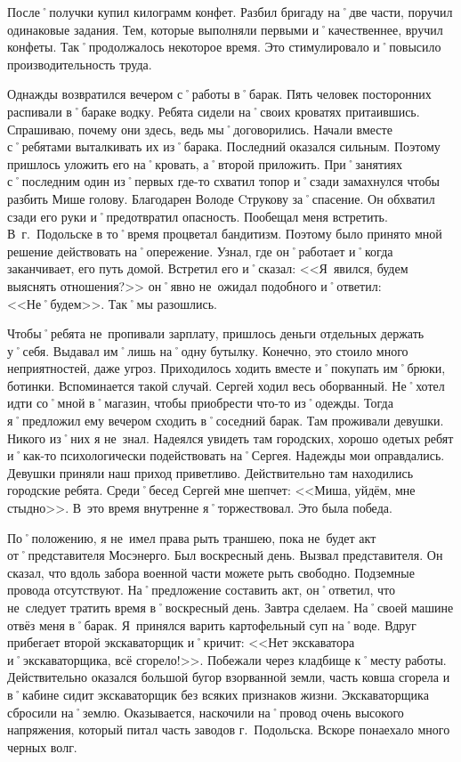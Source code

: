 После˚получки купил килограмм конфет. Разбил бригаду на˚две части, поручил одинаковые задания. Тем, которые выполняли первыми и˚качественнее, вручил конфеты. Так˚продолжалось некоторое время. Это стимулировало и˚повысило производительность труда.

Однажды возвратился вечером с˚работы в˚барак. Пять человек посторонних распивали в˚бараке водку. Ребята сидели на˚своих кроватях притаившись. Спрашиваю, почему они здесь, ведь мы˚договорились. Начали вместе с˚ребятами выталкивать их из˚барака. Последний оказался сильным. Поэтому пришлось уложить его на˚кровать, а˚второй приложить. При˚занятиях с˚последним один из˚первых где-то схватил топор и˚сзади замахнулся чтобы разбить Мише голову. Благодарен Володе Cтрукову за˚спасение. Он обхватил сзади его руки и˚предотвратил опасность. Пообещал меня встретить. В~г.~Подольске в то˚время процветал бандитизм. Поэтому было принято мной решение действовать на˚опережение. Узнал, где он˚работает и˚когда заканчивает, его путь домой. Встретил его и˚сказал: <<Я~явился, будем выяснять отношения?>> он˚явно не~ожидал подобного и˚ответил: <<Не˚будем>>. Так˚мы разошлись.

Чтобы˚ребята не~пропивали зарплату, пришлось деньги отдельных держать у˚себя. Выдавал им˚лишь на˚одну бутылку. Конечно, это стоило много неприятностей, даже угроз. Приходилось ходить вместе и˚покупать им˚брюки, ботинки. Вспоминается такой случай. Сергей ходил весь оборванный. Не˚хотел идти со˚мной в˚магазин, чтобы приобрести что-то из˚одежды. Тогда я˚предложил ему вечером сходить в˚соседний барак. Там проживали девушки. Никого из˚них я не~знал. Надеялся увидеть там городских, хорошо одетых ребят и˚как-то психологически подействовать на˚Сергея. Надежды мои оправдались. Девушки приняли наш приход приветливо. Действительно там находились городские ребята. Среди˚бесед Сергей мне шепчет: <<Миша, уйдём, мне стыдно>>. В~это время внутренне я˚торжествовал. Это была победа.

По˚положению, я не~имел права рыть траншею, пока не~будет акт от˚представителя Мосэнерго. Был воскресный день. Вызвал представителя. Он сказал, что вдоль забора военной части можете рыть свободно. Подземные провода отсутствуют. На˚предложение составить акт, он˚ответил, что не~следует тратить время в˚воскресный день. Завтра сделаем. На˚своей машине отвёз меня в˚барак. Я~принялся варить картофельный суп на˚воде. Вдруг прибегает второй экскаваторщик и˚кричит: <<Нет экскаватора и˚экскаваторщика, всё сгорело!>>. Побежали через кладбище к˚месту работы. Действительно оказался большой бугор взорванной земли, часть ковша сгорела и в˚кабине сидит экскаваторщик без всяких признаков жизни. Экскаваторщика сбросили на˚землю. Оказывается, наскочили на˚провод очень высокого напряжения, который питал часть заводов г.~Подольска. Вскоре понаехало много черных волг. 

